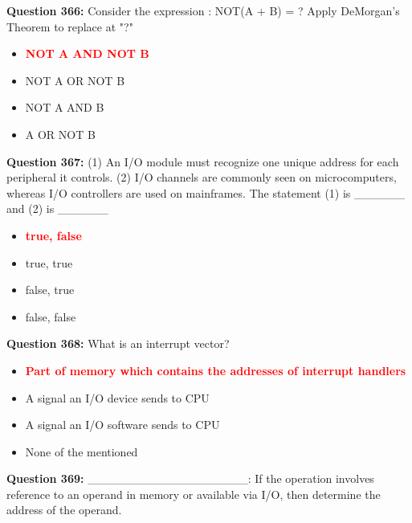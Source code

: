 \documentclass[12pt,a4paper]{article}
\begin{document}
\vspace{0.5cm}

\textbf{Question 366:} Consider the expression : NOT(A + B) = ? Apply DeMorgan's Theorem to replace at "?"

\begin{itemize}
    \item[\textbf{A.}] \textcolor{red}{\textbf{NOT A AND NOT B}}
    \item[\textbf{B.}] NOT A OR NOT B
    \item[\textbf{C.}] NOT A AND B
    \item[\textbf{D.}] A OR NOT B
\end{itemize}

\vspace{0.5cm}

\textbf{Question 367:} (1) An I/O module must recognize one unique address for each peripheral it controls. (2) I/O channels are commonly seen on microcomputers, whereas I/O controllers are used on mainframes. The statement (1) is ______ and (2) is ______

\begin{itemize}
    \item[\textbf{A.}] \textcolor{red}{\textbf{true, false}}
    \item[\textbf{B.}] true, true
    \item[\textbf{C.}] false, true
    \item[\textbf{D.}] false, false
\end{itemize}

\vspace{0.5cm}

\textbf{Question 368:} What is an interrupt vector?

\begin{itemize}
    \item[\textbf{A.}] \textcolor{red}{\textbf{Part of memory which contains the addresses of interrupt handlers}}
    \item[\textbf{B.}] A signal an I/O device sends to CPU
    \item[\textbf{C.}] A signal an I/O software sends to CPU
    \item[\textbf{D.}] None of the mentioned
\end{itemize}

\vspace{0.5cm}

\textbf{Question 369:} ___________________: If the operation involves reference to an operand in memory or available via I/O, then determine the address of the operand.
\end{document}
